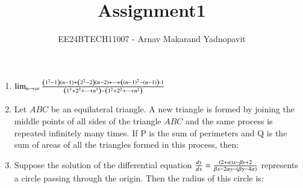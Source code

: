 \documentclass[journal,12pt,onecolumn]{IEEEtran}
\theoremstyle{remark}
\begin{document}
\title{Assignment1}
\author{EE24BTECH11007 - Arnav Makarand Yadnopavit}
\maketitle
\renewcommand{\thefigure}{\theenumi}
\renewcommand{\thetable}{\theenumi}
\begin{enumerate}
\item $\lim_{n\to\infty} \frac{\left(1^2 -1\right)\left(n-1\right)+\left(2^2 -2\right)\left(n-2\right)+\dots+\left(\left(n-1\right)^2 -\left(n-1\right)\right)\cdot1}{\left(1^3 +2^3 +\dots+n^3\right)-\left(1^2 +2^2 +\dots+n^2\right)}$
\begin{enumerate}
\end{enumerate}
\item Let $ABC$  be an equilateral triangle. A new triangle is formed by joining the middle points of all sides of the triangle $ABC$ and the same process is repeated infinitely many times. If P is the sum of perimeters and Q is the sum of areas of all the triangles formed in this process, then:
\begin{enumerate}
\end{enumerate}
\item Suppose the solution of the differential equation $\frac{dy}{dx} = \frac{\left(2+\alpha\right)x - \beta y + 2}{\beta x - 2\alpha y - \left(\beta\gamma - 4\alpha\right)}$ represents a circle passing through the origin. Then the radius of this circle is:
\begin{enumerate}
\end{enumerate}

\end{enumerate}
\end{document}
